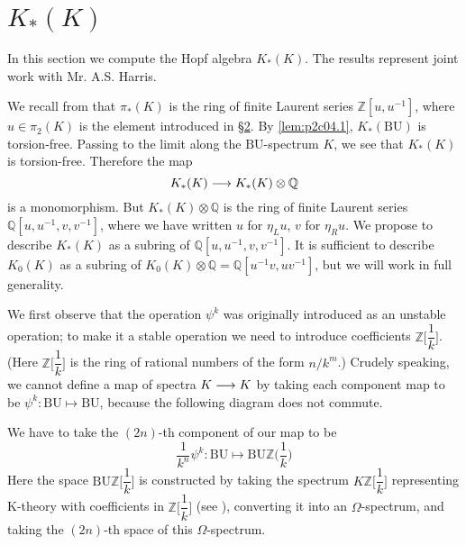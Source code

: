 \documentclass[../main]{subfiles}
\begin{document}
\label{sec:p2c13} %

\chapter{\texorpdfstring{$K_\ast(K)$}{KK}}

In this section we compute the Hopf algebra $K_\ast(K)$. The results represent joint work with Mr. A.S. Harris.

We recall from \cite{atiyahbott} that $\pi_\ast(K)$ is the ring of finite Laurent series $\mathbb{Z}[u, u^{-1}]$, where $u\in\pi_2(K)$ is the element introduced in \hyperref[sec:p2c2]{\S 2}. By \eqref{lem:p2c04.1}, $K_\ast(\mathrm{BU})$ is torsion-free. Passing to the limit along the $\mathrm{BU}$-spectrum $K$, we see that $K_\ast(K)$ is torsion-free. Therefore the map \[K_\ast(K)\longrightarrow K_\ast(K)\otimes \mathbb{Q}\] is a monomorphism. But $K_\ast(K)\otimes \mathbb{Q}$ is the ring of finite Laurent series $\mathbb{Q}[u,u^{-1},v,v^{-1}]$, where we have written $u$ for $\eta_L u$, $v$ for $\eta_R u$. We propose to describe $K_\ast(K)$ as a subring of $\mathbb{Q}[u,u^{-1},v,v^{-1}]$. It is sufficient to describe $K_0(K)$ as a subring of $K_0(K)\otimes\mathbb{Q}=\mathbb{Q}[u^{-1}v,uv^{-1}]$, but we will work in full generality. 

We first observe that the operation $\psi^k$ was originally introduced as an unstable operation; to make it a stable operation we need to introduce coefficients $\mathbb{Z}\Big[\dfrac{1}{k}\Big]$. (Here $\mathbb{Z}\Big[\dfrac{1}{k}\Big]$ is the ring of rational numbers of the form $n/k^m$.) Crudely speaking, we cannot define a map of spectra $K\longrightarrow K$ by taking each component map to be $\psi^k: \mathrm{BU}\mapsto \mathrm{BU}$, because the following diagram does not commute.
\begin{center}
\end{center}
We have to take the $(2n)$-th component of our map to be \[\dfrac{1}{k^n}\psi^k:\mathrm{BU}\mapsto \mathrm{BU}\mathbb{Z}\Big(\dfrac{1}{k}\Big)\]
Here the space $\mathrm{BU}\mathbb{Z}\Big[\dfrac{1}{k}\Big]$ is constructed by taking the spectrum $K\mathbb{Z}\Big[\dfrac{1}{k}\Big]$ representing K-theory with coefficients in $\mathbb{Z}\Big[\dfrac{1}{k}\Big]$ (see \cite{adams2}), converting it into an $\Omega$-spectrum, and taking the $(2n)$-th space of this $\Omega$-spectrum. 
\end{document}
